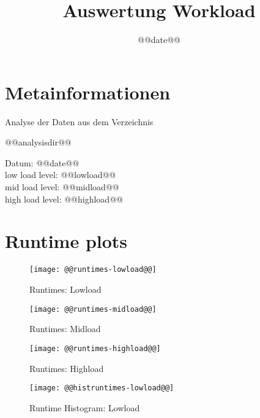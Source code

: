 \documentclass[11pt]{article}
\title{\textsf{Auswertung Workload}}
\date{@@date@@}
\begin{document}
{}

\maketitle

\section{Metainformationen}
Analyse der Daten aus dem Verzeichnis 
\begin{center}
@@analysisdir@@ 
\end{center}
Datum: @@date@@ \\
low load level: @@lowload@@ \\
mid load level: @@midload@@ \\
high load level: @@highload@@ \\

\newpage
\section{Runtime plots}

\begin{figure}[htbp]
  \begin{center}
    \texttt{[image: @@runtimes-lowload@@]}
    \caption{Runtimes: Lowload}
    \label{fig:rt-lowload}
  \end{center}
\end{figure}

\begin{figure}[htbp]
  \begin{center}
    \texttt{[image: @@runtimes-midload@@]}
    \caption{Runtimes: Midload}
    \label{fig:rt-midload}
  \end{center}
\end{figure}

\begin{figure}[htbp]
  \begin{center}
    \texttt{[image: @@runtimes-highload@@]}
    \caption{Runtimes: Highload}
    \label{fig:rt-highload}
  \end{center}
\end{figure}

\begin{figure}[htbp]
  \begin{center}
    \texttt{[image: @@histruntimes-lowload@@]}
    \caption{Runtime Histogram: Lowload}
    \label{fig:rt-hist-lowload}
  \end{center}
\end{figure}
\end{document}
